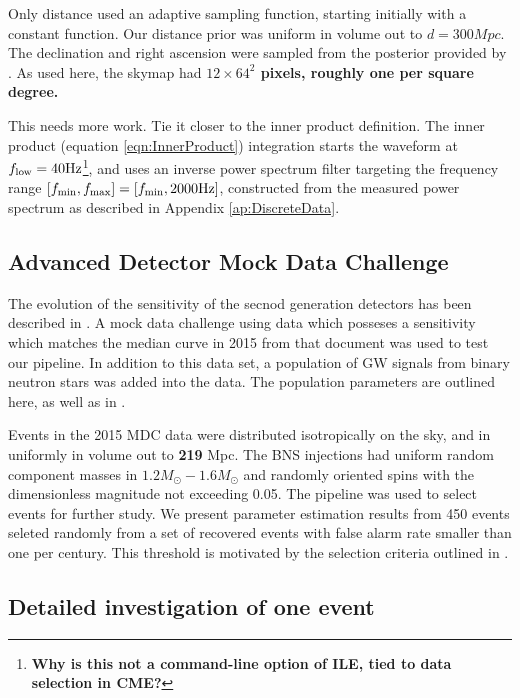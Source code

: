 Only distance used an adaptive sampling function, starting initially with a constant function. Our distance prior was uniform in volume out to $d=300\unit{Mpc}$. The declination and right ascension were sampled from the posterior provided by \BS. As used here, the skymap had \textbf{$12\times 64^2$ pixels, roughly one per square degree.}

{\color{blue} This needs more work. Tie it closer to the inner product definition.}
The inner product (equation \ref{eqn:InnerProduct}) integration starts the waveform at $f_{\rm low}=40{\rm Hz}$\footnote{ \textbf{Why is this not a command-line option of ILE, tied to data selection in CME?}}, and uses an inverse power spectrum filter targeting the frequency range $[f_{\rm min},f_{\rm max}]=[f_{\rm min}, 2000{\rm Hz}]$, constructed from the measured power spectrum as described in Appendix \ref{ap:DiscreteData}.  

\subsection{Advanced Detector Mock Data Challenge}
\label{sec:BNS_2015_MDC}

The evolution of the sensitivity of the secnod generation detectors has been described in \cite{}. A mock data challenge using data which posseses a sensitivity which matches the median curve in 2015 from that document was used to test our pipeline. In addition to this data set, a population of GW signals from binary neutron stars was added into the data. The population parameters are outlined here, as well as in \cite{first2years}.

Events in the 2015 MDC data were distributed isotropically on the sky, and in uniformly in volume out to \textbf{219} \unit{Mpc}. The BNS injections had uniform random component masses in $1.2 M_\odot-1.6 M_\odot$ and randomly oriented spins with the dimensionless magnitude not exceeding 0.05. The \gstlal{} pipeline was used to select events for further study. We present parameter estimation results from 450 events seleted randomly from a set of recovered events with false alarm rate smaller than one per century. This threshold is motivated by the selection criteria outlined in \cite{obsscendoc}.


\subsection{Detailed investigation of one event}
%    

